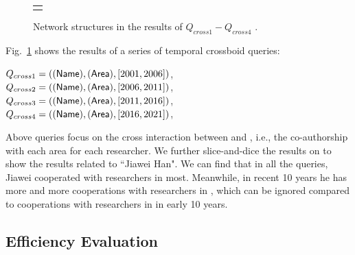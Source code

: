 \documentclass[10pt,journal,compsoc]{IEEEtran}
\begin{document}
\begin{figure}[t!]
\begin{center}
\begin{tabular}[t]{c}
{			}
		\end{tabular}
	\end{center}
	\vspace*{-0.4cm}
	\caption{Network structures in the results of $ Q_{cross1}-Q_{cross4} $ . }
	\vspace*{-0.4cm}
	\label{fig:dblp_cross}
\end{figure}
Fig.~\ref{fig:dblp_cross} shows the results of a series of temporal crossboid queries:
\begin{center}
	$ Q_{cross1}=(({\mathsf{Name}}),({\mathsf{Area}}),[2001,2006]) $,\\$ Q_{cross2}=(({\mathsf{Name}}),({\mathsf{Area}}),[2006,2011]) $,\\$ Q_{cross3}=(({\mathsf{Name}}),({\mathsf{Area}}),[2011,2016]) $,\\$ Q_{cross4}=(({\mathsf{Name}}),({\mathsf{Area}}),[2016,2021]) $,
\end{center}
 Above queries focus on the cross interaction between  and , i.e., the co-authorship with each area for each researcher. We further slice-and-dice the results on  to show the results related to ``Jiawei Han". We can find that in all the queries, Jiawei cooperated with researchers in  most. Meanwhile, in recent 10 years he has more and more cooperations with researchers in , which can be ignored compared to cooperations with researchers in  in early 10 years. 

\subsection{Efficiency Evaluation} \label{subsec:efficiency_eva}
\end{document}
